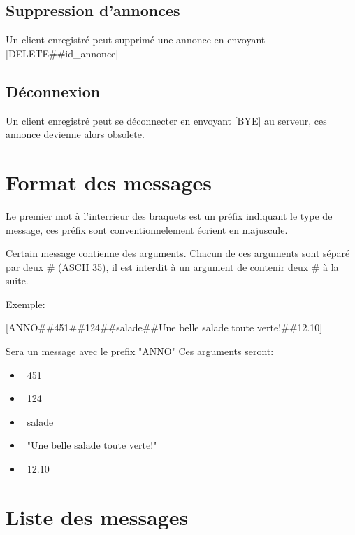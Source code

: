\documentclass[12pt]{article}
\begin{document}
\subsection{Suppression d'annonces}

Un client enregistré peut supprimé une annonce en envoyant [DELETE\#\#id\_annonce]


\subsection{Déconnexion}

Un client enregistré peut se déconnecter en envoyant [BYE] au serveur, ces annonce devienne alors obsolete.

\section{Format des messages}


Le premier mot à l'interrieur des braquets est un préfix indiquant le type de message, ces préfix sont conventionnelement écrient en majuscule.

Certain message contienne des arguments. Chacun de ces arguments sont séparé par deux \# (ASCII 35), 
il est interdit à un argument de contenir deux \# à la suite.

Exemple: 

[ANNO\#\#451\#\#124\#\#salade\#\#Une belle salade toute verte!\#\#12.10] 

Sera un message avec le prefix "ANNO"
Ces arguments seront:
\begin{itemize}
  \item~451
  \item~124
  \item~salade
  \item~"Une belle salade toute verte!"
  \item~12.10
\end{itemize}

\section{Liste des messages}
\end{document}
